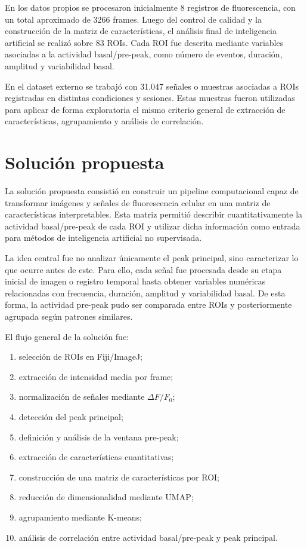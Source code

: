 \documentclass[10pt,twocolumn]{article}
\begin{document}
En los datos propios se procesaron inicialmente 8 registros de fluorescencia, con un total aproximado de 3266 frames. Luego del control de calidad y la construcción de la matriz de características, el análisis final de inteligencia artificial se realizó sobre 83 ROIs. Cada ROI fue descrita mediante variables asociadas a la actividad basal/pre-peak, como número de eventos, duración, amplitud y variabilidad basal.

En el dataset externo se trabajó con 31.047 señales o muestras asociadas a ROIs registradas en distintas condiciones y sesiones. Estas muestras fueron utilizadas para aplicar de forma exploratoria el mismo criterio general de extracción de características, agrupamiento y análisis de correlación.
\section{Solución propuesta}

La solución propuesta consistió en construir un pipeline computacional capaz de transformar imágenes y señales de fluorescencia celular en una matriz de características interpretables. Esta matriz permitió describir cuantitativamente la actividad basal/pre-peak de cada ROI y utilizar dicha información como entrada para métodos de inteligencia artificial no supervisada.

La idea central fue no analizar únicamente el peak principal, sino caracterizar lo que ocurre antes de este. Para ello, cada señal fue procesada desde su etapa inicial de imagen o registro temporal hasta obtener variables numéricas relacionadas con frecuencia, duración, amplitud y variabilidad basal. De esta forma, la actividad pre-peak pudo ser comparada entre ROIs y posteriormente agrupada según patrones similares.

El flujo general de la solución fue:

\begin{enumerate}
    \item selección de ROIs en Fiji/ImageJ;
    \item extracción de intensidad media por frame;
    \item normalización de señales mediante $\Delta F/F_0$;
    \item detección del peak principal;
    \item definición y análisis de la ventana pre-peak;
    \item extracción de características cuantitativas;
    \item construcción de una matriz de características por ROI;
    \item reducción de dimensionalidad mediante UMAP;
    \item agrupamiento mediante K-means;
    \item análisis de correlación entre actividad basal/pre-peak y peak principal.
\end{enumerate}
\end{document}
